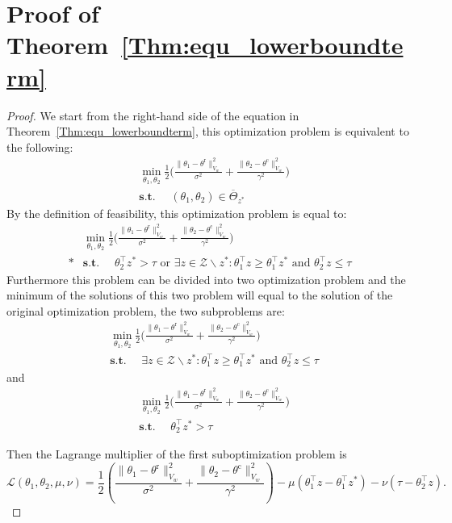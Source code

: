 \documentclass[accepted]{uai2025} %
\theoremstyle{plain}
\theoremstyle{definition}
\theoremstyle{remark}
\newcommand{\thetac}{\theta^{\mathrm{c}}}
\newcommand{\thetar}{\theta^{\mathrm{r}}}
\begin{document}
\section{Proof of Theorem~\ref{Thm:equ_lowerboundterm}}

\begin{proof}
    We start from the right-hand side of the equation in Theorem~\ref{Thm:equ_lowerboundterm}, this optimization problem is equivalent to the following:
    \begin{align*}
       &\min_{\theta_1, \theta_2} \frac{1}{2} \bigg(  \frac{\lVert\theta_1-\thetar\rVert^2_{V_w^{}}}{\sigma^2}+\frac{\lVert\theta_2-\thetac\rVert^2_{V_w^{}}}{\gamma^2}\bigg)
        \\&\textbf{s.t. }\quad (\theta_1,\theta_2)\in \overline{\Theta}_{z^*}
    \end{align*}
    By the definition of feasibility, this optimization problem is equal to:
    \begin{align*}
        &\min_{\theta_1, \theta_2} \frac{1}{2} \bigg(  \frac{\lVert\theta_1-\thetar\rVert^2_{V_w^{}}}{\sigma^2}+\frac{\lVert\theta_2-\thetac\rVert^2_{V_w^{}}}{\gamma^2}\bigg)
        \\*&\textbf{s.t. }\quad \theta_2^\top z^*>\tau \mbox{ or }\exists z\in \mathcal{Z}\backslash z^*: \theta_1^\top z\ge \theta_1^\top z^* \mbox{ and } \theta_2^\top z \le \tau 
    \end{align*}
Furthermore this problem can be divided into two optimization problem and the minimum of the solutions of this two problem will equal to the solution of the original optimization problem, the two subproblems are:
\begin{align*}
        &\min_{\theta_1, \theta_2} \frac{1}{2} \bigg(  \frac{\lVert\theta_1-\thetar\rVert^2_{V_w^{}}}{\sigma^2}+\frac{\lVert\theta_2-\thetac\rVert^2_{V_w^{}}}{\gamma^2}\bigg)
        \\&\textbf{s.t. }\quad \exists z\in \mathcal{Z}\backslash z^*: \theta_1^\top z\ge \theta_1^\top z^* \mbox{ and } \theta_2^\top z \le \tau 
    \end{align*}
and       
\begin{align}&\min_{\theta_1, \theta_2} \frac{1}{2} \bigg(  \frac{\lVert\theta_1-\thetar\rVert^2_{V_w^{}}}{\sigma^2}+\frac{\lVert\theta_2-\thetac\rVert^2_{V_w^{}}}{\gamma^2}\bigg)
        \\&\textbf{s.t. }\quad \theta_2^\top z^*>\tau  
    \end{align}


Then the Lagrange multiplier of the first suboptimization problem is 
\[
\mathcal{L}(\theta_1, \theta_2, \mu, \nu) = 
\frac{1}{2} \left(\frac{\lVert\theta_1-\thetar\rVert^2_{V_w^{}}}{\sigma^2}+\frac{\lVert\theta_2-\thetac\rVert^2_{V_w^{}}}{\gamma^2}
\right)
- \mu (\theta_1^\top z - \theta_1^\top z^*) 
- \nu (\tau - \theta_2^\top z).
\]


\end{proof}
\end{document}
